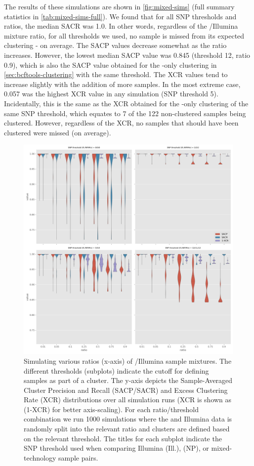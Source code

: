 The results of these simulations are shown in \autoref{fig:mixed-sims} (full summary statistics in \autoref{tab:mixed-sims-full}). We found that for all SNP thresholds and ratios, the median SACR was 1.0. In other words, regardless of the \ont{}/Illumina mixture ratio, for all thresholds we used, no sample is missed from its expected clustering - on average. The SACP values decrease somewhat as the \ont{}ratio increases. However, the lowest median SACP value was 0.845 (threshold 12, ratio 0.9), which is also the SACP value obtained for the \ont{}-only clustering in \autoref{sec:bcftools-clustering} with the same threshold. The XCR values tend to increase slightly with the addition of more \ont{} samples. In the most extreme case, 0.057 was the highest XCR value in any simulation (SNP threshold 5). Incidentally, this is the same as the XCR obtained for the \ont{}-only clustering of the same SNP threshold, which equates to 7 of the 122 non-clustered samples being clustered. However, regardless of the XCR, no samples that should have been clustered were missed (on average).

\begin{figure}
\begin{center}
\includegraphics[width=0.90\columnwidth]{Chapter2/Figs/mixed_simulations.png}
\caption{{Simulating various ratios (x-axis) of \ont{}/Illumina sample mixtures. The different thresholds (subplots) indicate the cutoff for defining samples as part of a cluster. The y-axis depicts the Sample-Averaged Cluster Precision and Recall (SACP/SACR) and Excess Clustering Rate (XCR) distributions over all simulation runs (XCR is shown as (1-XCR) for better axis-scaling). For each ratio/threshold combination we run 1000 simulations where the \ont{} and Illumina data is randomly split into the relevant ratio and clusters are defined based on the relevant threshold. The titles for each subplot indicate the SNP threshold used when comparing Illumina (Ill.), \ont{} (NP), or mixed-technology sample pairs.
{\label{fig:mixed-sims}}%
}}
\end{center}
\end{figure}

